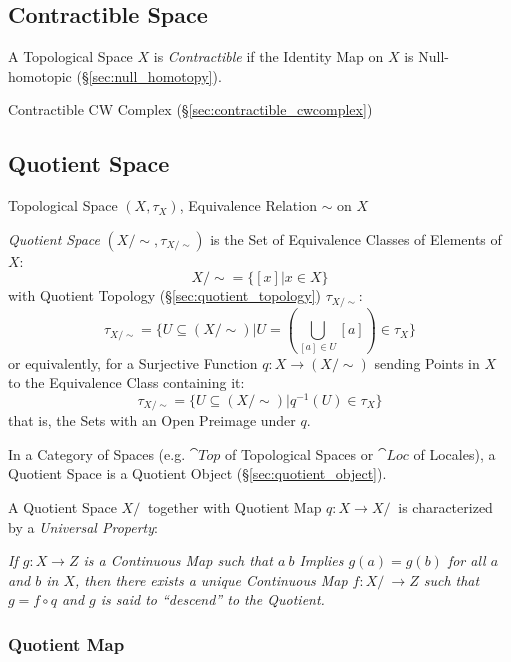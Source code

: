\subsection{Contractible Space}\label{sec:contractible_space}

A Topological Space $X$ is \emph{Contractible} if the Identity Map on
$X$ is Null-homotopic (\S\ref{sec:null_homotopy}).

Contractible CW Complex (\S\ref{sec:contractible_cwcomplex})



\subsection{Quotient Space}\label{sec:quotient_space}

Topological Space $(X, \tau_X)$, Equivalence Relation $\sim$ on $X$

\emph{Quotient Space} $(X/\sim, \tau_{X/\sim})$ is the Set of Equivalence
Classes of Elements of $X$:
\[
  X / \sim = \{ [x] | x \in X \}
\]
with Quotient Topology (\S\ref{sec:quotient_topology}) $\tau_{X/\sim}$:
\[
  \tau_{X/\sim} = \{ U \subseteq (X/\sim) |
    U = (\bigcup_{[a] \in U} [a]) \in \tau_X \}
\]
or equivalently, for a Surjective Function $q : X \rightarrow (X / \sim)$
sending Points in $X$ to the Equivalence Class containing it:
\[
  \tau_{X/\sim} = \{ U \subseteq (X/\sim) | q^{-1}(U) \in \tau_X \}
\]
that is, the Sets with an Open Preimage under $q$.

In a Category of Spaces (e.g. $\cat{Top}$ of Topological Spaces or $\cat{Loc}$
of Locales), a Quotient Space is a Quotient Object
(\S\ref{sec:quotient_object}).

A Quotient Space $X/~$ together with Quotient Map $q : X \rightarrow X/~$ is
characterized by a \emph{Universal Property}:

\emph{If $g : X \rightarrow Z$ is a Continuous Map such that $a ~ b$ Implies $g(a)
  = g(b)$ for all $a$ and $b$ in $X$, then there exists a unique Continuous Map
  $f : X/~ \rightarrow Z$ such that $g = f \circ q$ and $g$ is said to
  ``descend'' to the Quotient.}



\subsubsection{Quotient Map}\label{sec:quotient_map}

